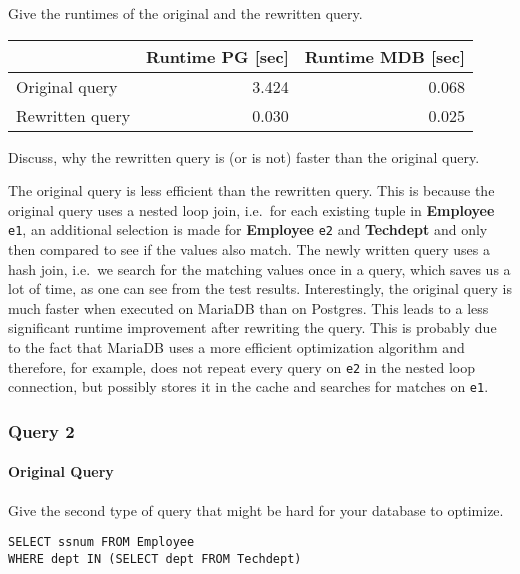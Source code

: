 \documentclass[11pt]{scrartcl}
\begin{document}
    Give the runtimes of the original and the rewritten query.

    \begin{table}[H]
        \centering
        \begin{tabular}{l|r|r}
            & Runtime PG [sec] & Runtime MDB [sec] \tabularnewline
            \hline
            Original query & 3.424 & 0.068 \tabularnewline
            Rewritten query & 0.030 & 0.025 \tabularnewline
        \end{tabular}
    \end{table}

    Discuss, why the rewritten query is (or is not) faster than the original query.

    The original query is less efficient than the rewritten query.
    This is because the original query uses a nested loop join, i.e.\ for each existing tuple in \textbf{Employee}
    \texttt{e1}, an additional selection is made for \textbf{Employee} \texttt{e2} and \textbf{Techdept} and only then
    compared to see if the values also match.
    The newly written query uses a hash join, i.e.\ we search for the matching values once in a query, which saves us a
    lot of time, as one can see from the test results. \newline
    Interestingly, the original query is much faster when executed on MariaDB than on Postgres.
    This leads to a less significant runtime improvement after rewriting the query.
    This is probably due to the fact that MariaDB uses a more efficient optimization algorithm and therefore, for
    example, does not repeat every query on \texttt{e2} in the nested loop connection, but possibly stores it in the cache and
    searches for matches on \texttt{e1}.

    \subsubsection*{Query 2}

    \paragraph{Original Query}

    Give the second type of query that might be hard for your database to optimize.

    \begin{lstlisting}[style=dbtsql]
SELECT ssnum FROM Employee
WHERE dept IN (SELECT dept FROM Techdept)
    \end{lstlisting}
\end{document}

